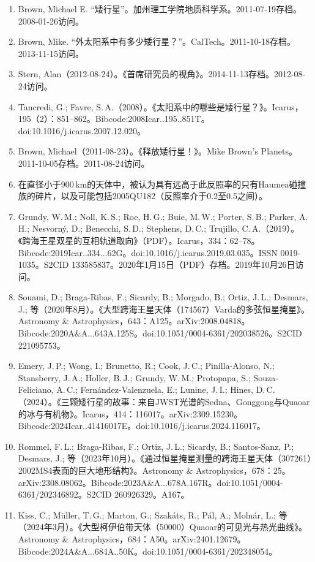 \begin{enumerate}
\item Brown, Michael E. “矮行星”。加州理工学院地质科学系。2011-07-19存档。2008-01-26访问。
\item Brown, Mike. “外太阳系中有多少矮行星？”。CalTech。2011-10-18存档。2013-11-15访问。
\item Stern, Alan（2012-08-24）。《首席研究员的视角》。2014-11-13存档。2012-08-24访问。
\item Tancredi, G.; Favre, S.\,A.（2008）。《太阳系中的哪些是矮行星？》。Icarus，195（2）：851–862。Bibcode:2008Icar..195..851T。doi:10.1016/j.icarus.2007.12.020。
\item Brown, Michael（2011-08-23）。《释放矮行星！》。Mike Brown's Planets。2011-10-05存档。2011-08-24访问。
\item 在直径小于900\,km的天体中，被认为具有远高于此反照率的只有Haumea碰撞族的碎片，以及可能包括2005QU182（反照率介于0.2至0.5之间）。
\item Grundy, W.\,M.; Noll, K.\,S.; Roe, H.\,G.; Buie, M.\,W.; Porter, S.\,B.; Parker, A.\,H.; Nesvorný, D.; Benecchi, S.\,D.; Stephens, D.\,C.; Trujillo, C.\,A.（2019）。《跨海王星双星的互相轨道取向》（PDF）。Icarus，334：62–78。Bibcode:2019Icar..334...62G。doi:10.1016/j.icarus.2019.03.035。ISSN 0019-1035。S2CID 133585837。2020年1月15日（PDF）存档。2019年10月26日访问。
\item Souami, D.; Braga-Ribas, F.; Sicardy, B.; Morgado, B.; Ortiz, J.\,L.; Desmars, J.; 等（2020年8月）。《大型跨海王星天体（174567）Varda的多弦恒星掩星》。Astronomy \& Astrophysics，643：A125。arXiv:2008.04818。Bibcode:2020A\&A...643A.125S。doi:10.1051/0004-6361/202038526。S2CID 221095753。
\item Emery, J.\,P.; Wong, I.; Brunetto, R.; Cook, J.\,C.; Pinilla-Alonso, N.; Stansberry, J.\,A.; Holler, B.\,J.; Grundy, W.\,M.; Protopapa, S.; Souza-Feliciano, A.\,C.; Fernández-Valenzuela, E.; Lunine, J.\,I.; Hines, D.\,C.（2024）。《三颗矮行星的故事：来自JWST光谱的Sedna、Gonggong与Quaoar的冰与有机物》。Icarus，414：116017。arXiv:2309.15230。Bibcode:2024Icar..41416017E。doi:10.1016/j.icarus.2024.116017。
\item Rommel, F.\,L.; Braga-Ribas, F.; Ortiz, J.\,L.; Sicardy, B.; Santos-Sanz, P.; Desmars, J.; 等（2023年10月）。《通过恒星掩星测量的跨海王星天体（307261）2002MS4表面的巨大地形结构》。Astronomy \& Astrophysics，678：25。arXiv:2308.08062。Bibcode:2023A\&A...678A.167R。doi:10.1051/0004-6361/202346892。S2CID 260926329。A167。
\item Kiss, C.; Müller, T.\,G.; Marton, G.; Szakáts, R.; Pál, A.; Molnár, L.; 等（2024年3月）。《大型柯伊伯带天体（50000）Quaoar的可见光与热光曲线》。Astronomy \& Astrophysics，684：A50。arXiv:2401.12679。Bibcode:2024A\&A...684A..50K。doi:10.1051/0004-6361/202348054。

\end{enumerate}
